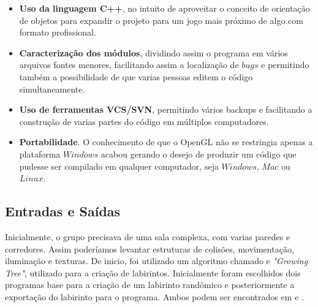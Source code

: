 \begin{itemize}
	\item \textbf{Uso da linguagem C++}, no intuito de aproveitar o conceito de orientação de objetos para expandir o projeto para um jogo mais próximo de algo com formato profissional.
	\item \textbf{Caracterização dos módulos}, dividindo assim o programa em vários arquivos fontes menores, facilitando assim a localização de $bugs$ e permitindo também a possibilidade de que varias pessoas editem o código simultaneamente.
	\item \textbf{Uso de ferramentas VCS/SVN}, permitindo vários backups e facilitando a construção de varias partes do código em múltiplos computadores.
	\item \textbf{Portabilidade}. O conhecimento de que o OpenGL não se restringia apenas a plataforma $Windows$ acabou gerando o desejo de produzir um código que pudesse ser compilado em qualquer computador, seja $Windows$, $Mac$ ou $Linux$.
\end{itemize}


\subsection{Entradas e Saídas}\label{inputs}

Inicialmente, o grupo precisava de uma sala complexa, com varias paredes e corredores. Assim poderíamos levantar estruturas de colisões, movimentação, iluminação e texturas. De inicio, foi utilizado um algoritmo chamado e \textit{"Growing Tree"}\cite{algrithm}, utilizado para a criação de labirintos. Inicialmente foram escolhidos dois programas base para a criação de um labirinto randômico e posteriormente a exportação do labirinto para o programa. Ambos podem ser encontrados em \cite{ruby} e \cite{python}.

